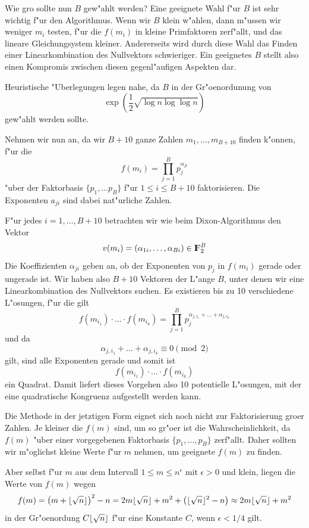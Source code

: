 Wie gro\3 sollte nun $B$ gew"ahlt werden? Eine geeignete Wahl f"ur $B$ 
ist sehr wichtig f"ur den Algorithmus. Wenn wir $B$ klein
w"ahlen, dann m"ussen wir weniger $m_i$ testen, f"ur die $f(m_i)$ in
kleine Primfaktoren zerf"allt, und das lineare Gleichungsystem kleiner.
Andererseits wird durch diese Wahl das Finden einer Linearkombination des 
Nullvektors schwieriger. Ein geeignetes $B$ stellt also einen Kompromis zwischen
diesen gegenl"aufigen Aspekten dar.

Heuristische "Uberlegungen legen nahe, da\3 $B$ in der Gr"o\3enordunung von
$$ \exp \left(\frac{1}{2}\sqrt{\log n \log\log n} \right) $$
gew"ahlt werden sollte.

Nehmen wir nun an, da\3 wir $B+10$ ganze Zahlen $m_1,\ldots,m_{B+10}$
finden k"onnen, f"ur die
$$ f(m_i) = \prod_{j=1}^{B} p_j^{\alpha_{ji}} $$
"uber der Faktorbasis $\{ p_1,\ldots p_B\}$ f"ur $1 \le i \le B+10$ 
faktorisieren. Die Exponenten $a_{ji}$ sind dabei nat"urliche Zahlen.

F"ur jedes $i=1,\ldots, B+10$ betrachten wir wie beim Dixon-Algorithmus
den Vektor
$$ v(m_i) = (\alpha_{1i},\ldots,\alpha_{B i}) \in\koerper{2}^{B} $$
Die Koeffizienten $\alpha_{ji}$ geben an, ob der Exponenten von $p_j$
in $f(m_i)$ gerade oder ungerade ist. Wir haben also $B+10$
Vektoren der L"ange $B$, unter denen wir eine Linearkombination
des Nullvektors suchen. Es existieren bis zu 10 verschiedene L"osungen, 
f"ur die gilt
$$ f(m_{i_1})\cdot\ldots\cdot f(m_{i_k}) = 
   \prod_{j=1}^B p_j^{\alpha_{j,i_1} + \ldots + \alpha_{j,i_k}} $$
und da
$$ \alpha_{j,i_1} + \ldots + \alpha_{j,i_k} \equiv 0 \pmod{2} $$
gilt, sind alle Exponenten gerade und somit ist
$$ f(m_{i_1}) \cdot\ldots\cdot f(m_{i_k}) $$
ein Quadrat. Damit liefert dieses Vorgehen also 10 potentielle
L"osungen, mit der eine quadratische Kongruenz aufgestellt werden
kann.

Die Methode in der jetztigen Form eignet sich noch nicht zur
Faktorisierung gro\3er Zahlen. Je kleiner die $f(m)$ sind, um so
gr"o\3er ist die Wahrscheinlichkeit, da\3 $f(m)$ "uber einer
vorgegebenen Faktorbasis $\{ p_1,\ldots,p_B\}$ zerf"allt. Daher
sollten wir m"oglichst kleine Werte f"ur $m$ nehmen, um geeignete
$f(m)$ zu finden.

Aber selbst f"ur $m$ aus dem Intervall $1\le m \le n^{\epsilon}$ mit
$\epsilon > 0$ und klein, liegen die Werte von $f(m)$ wegen
$$ f(m) = \left( m + \lfloor \sqrt{n} \rfloor\right)^2 - n = 
   2m\lfloor \sqrt{n} \rfloor + m^2 + \left( \lfloor \sqrt{n} \rfloor^2 - n \right) 
   \approx 2m\lfloor \sqrt{n} \rfloor + m^2 $$
in der Gr"o\3enordung $C\lfloor \sqrt{n} \rfloor$ f"ur eine Konstante $C$, 
wenn $\epsilon < 1/4$ gilt.


